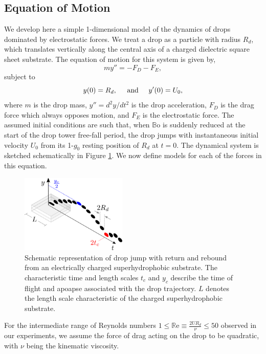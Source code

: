 \documentclass[aip,reprint, floatfix]{revtex4-1}
\begin{document}
\subsection{Equation of Motion}
We develop here a simple 1-dimensional model of the dynamics of drops dominated by electrostatic forces. We treat a drop as a particle with radius $R_d$, which translates vertically along the central axis of a charged dielectric square sheet substrate. The equation of motion for this system is given by,
\begin{equation}
m y'' = - F_D - F_E,
\label{gov_eqn}
\end{equation}
subject to
\begin{equation}
y(0) = R_d, \hspace{5 mm} \mbox{and} \hspace{5 mm} y'(0) = U_0,
\end{equation}
where $m$ is the drop mass, $y'' = d^2 y/d t^2$ is the drop acceleration, $F_D$ is the drag force which always opposes motion, and $F_E$ is the electrostatic force. The assumed initial conditions are such that, when $\mathbb{B}\mbox{o}$ is suddenly reduced at the start of the drop tower free-fall period, the drop jumps with instantaneous initial velocity $U_0$ from its 1-$g_0$ resting position of $R_d$ at $t=0$. The dynamical system is sketched schematically in Figure \ref{fig:apparatus}. We now define models for each of the forces in this equation.

\begin{figure}[ht]
\centering
\includegraphics[width=0.45\textwidth]{../figures/apparatus3.pdf}
\caption{Schematic representation of drop jump with return and rebound from an electrically charged superhydrophobic substrate. The characteristic time and length scales $t_c$ and $y_c$ describe the time of flight and apoapse associated with the drop trajectory. $L$ denotes the length scale characteristic of the charged superhydrophobic substrate.}
\label{fig:apparatus}
\end{figure}

For the intermediate range of Reynolds numbers $1 \leq \mathbb{R}\mbox{e} \equiv \frac{2UR_d}{\nu} \leq 50 $ observed in our experiments, we assume the force of drag acting on the drop to be quadratic, with $\nu$ being the kinematic viscosity.
\end{document}
